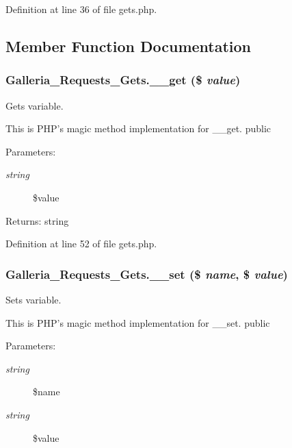 Definition at line 36 of file gets.php.

\subsection{Member Function Documentation}
\subsubsection{\setlength{\rightskip}{0pt plus 5cm}Galleria\_\-Requests\_\-Gets.\_\-\_\-get (\$ {\em value})}\label{classGalleria__Requests__Gets_97189b52218e2b584c133a7d2c1e52c5}


Gets variable.

This is PHP's magic method implementation for \_\-\_\-get.  public \begin{Desc}
\item[Parameters:]
\begin{description}
\item[{\em string}]\$value \end{description}
\end{Desc}
\begin{Desc}
\item[Returns:]string \end{Desc}


Definition at line 52 of file gets.php.
\subsubsection{\setlength{\rightskip}{0pt plus 5cm}Galleria\_\-Requests\_\-Gets.\_\-\_\-set (\$ {\em name}, \$ {\em value})}\label{classGalleria__Requests__Gets_72763c8048d0d8549ee549f181fda6d7}


Sets variable.

This is PHP's magic method implementation for \_\-\_\-set.  public \begin{Desc}
\item[Parameters:]
\begin{description}
\item[{\em string}]\$name \item[{\em string}]\$value \end{description}
\end{Desc}


